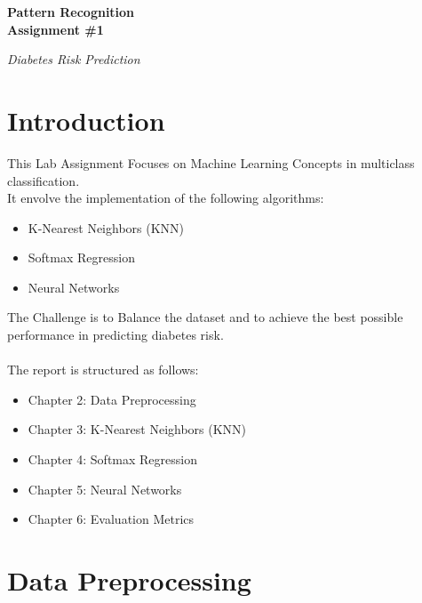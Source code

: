 \documentclass[12pt,a4paper]{report}
\begin{document}
\begin{titlepage}
    \centering
    \vspace*{\fill}
    {\LARGE\bfseries Pattern Recognition \\ Assignment \#1\par}
    \vspace{2cm}
    {\LARGE  \quad \textit{Diabetes Risk Prediction} \par}
    \vspace*{\fill}
\end{titlepage}

\tableofcontents
\newpage

\chapter{Introduction}
\Large This Lab Assignment Focuses on Machine Learning Concepts in multiclass classification. \\
It envolve the implementation of the following algorithms:
\begin{itemize}
    \item K-Nearest Neighbors (KNN)
    \item Softmax Regression
    \item Neural Networks
\end{itemize}
The Challenge is to Balance the dataset and to achieve the best possible performance in predicting diabetes risk. \\ \\
The report is structured as follows:
\begin{itemize}
    \item Chapter 2: Data Preprocessing
    \item Chapter 3: K-Nearest Neighbors (KNN)
    \item Chapter 4: Softmax Regression
    \item Chapter 5: Neural Networks
    \item Chapter 6: Evaluation Metrics
\end{itemize}

\newpage

\chapter{Data Preprocessing}
\end{document}
